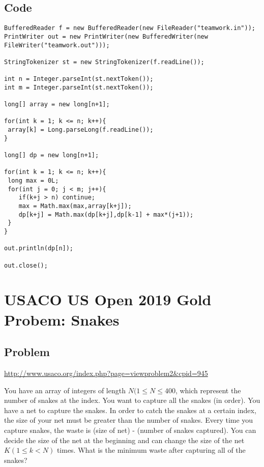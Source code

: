 \documentclass{article}
\begin{document}
\subsection{Code}
\begin{lstlisting}
BufferedReader f = new BufferedReader(new FileReader("teamwork.in"));
PrintWriter out = new PrintWriter(new BufferedWriter(new FileWriter("teamwork.out")));

StringTokenizer st = new StringTokenizer(f.readLine());

int n = Integer.parseInt(st.nextToken());
int m = Integer.parseInt(st.nextToken());

long[] array = new long[n+1];

for(int k = 1; k <= n; k++){
 array[k] = Long.parseLong(f.readLine());
}

long[] dp = new long[n+1];

for(int k = 1; k <= n; k++){
 long max = 0L;
 for(int j = 0; j < m; j++){
    if(k+j > n) continue;
    max = Math.max(max,array[k+j]);
    dp[k+j] = Math.max(dp[k+j],dp[k-1] + max*(j+1));
 }
}

out.println(dp[n]);

out.close();
\end{lstlisting}



\section{USACO US Open 2019 Gold Probem: Snakes}
\subsection{Problem}
\url{http://www.usaco.org/index.php?page=viewproblem2&cpid=945}

You have an array of integers of length $N (1 \leq N \leq 400$, which represent the number of snakes at the index. You want to capture all the snakes (in order). You have a net to capture the snakes. In order to catch the snakes at a certain index, the size of your net must be greater than the number of snakes. Every time you capture snakes, the waste is (size of net) - (number of snakes captured). You can decide the size of the net at the beginning and can change the size of the net $K (1 \leq k < N)$ times. What is the minimum waste after capturing all of the snakes? 
\end{document}
